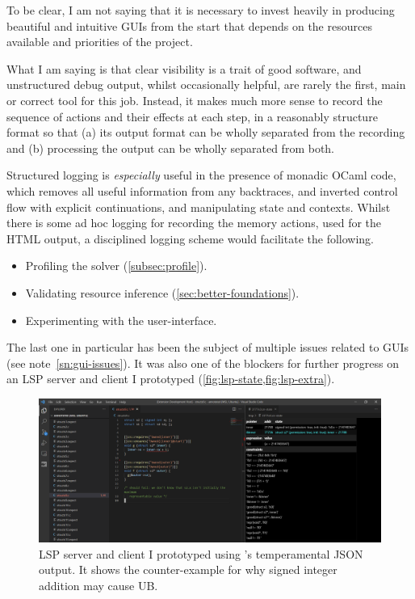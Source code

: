 To be clear, I am not saying that it is necessary to invest heavily in
producing beautiful and intuitive GUIs from the start \textemdash{} that
depends on the resources available and priorities of the project.

What I am saying is that clear visibility is a trait of good software, and
unstructured debug output, whilst occasionally helpful, are rarely the first,
main or correct tool for this job. Instead, it makes much more sense to record
the sequence of actions and their effects at each step, in a reasonably
structure format so that (a) its output format can be wholly separated from the
recording and (b) processing the output can be wholly separated from both.

Structured logging is \emph{especially} useful in the presence of monadic OCaml
code, which removes all useful information from any backtraces, and inverted
control flow with explicit continuations, and manipulating state and contexts.
Whilst there is some ad hoc logging for recording the memory actions, used
for the HTML output, a disciplined logging scheme would facilitate the
following.
\begin{itemize}
    \item Profiling the solver (\cref{subsec:profile}).
    \item Validating resource inference (\cref{sec:better-foundations}).
    \item Experimenting with the user-interface.
\end{itemize}

The last one in particular has been the subject of multiple issues related to
GUIs (see note~\ref{sn:gui-issues}). It was also one of the blockers for
further progress on an LSP
server and
client I
prototyped (\cref{fig:lsp-state,fig:lsp-extra}).

\begin{figure}[tp]
    \includegraphics{figures/lsp-structs9-state.png}
    \caption{LSP server and client I prototyped using 's temperamental
        JSON output. It shows the counter-example for why signed integer
        addition may cause UB.}\label{fig:lsp-state}
\end{figure}

